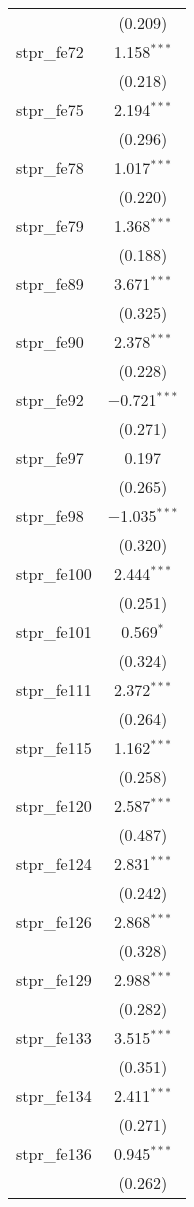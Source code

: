 \begin{table}[!htbp]
\begin{tabular}{@{\extracolsep{5pt}}lc}
  & (0.209) \\ 
  stpr\_fe72 & 1.158$^{***}$ \\ 
  & (0.218) \\ 
  stpr\_fe75 & 2.194$^{***}$ \\ 
  & (0.296) \\ 
  stpr\_fe78 & 1.017$^{***}$ \\ 
  & (0.220) \\ 
  stpr\_fe79 & 1.368$^{***}$ \\ 
  & (0.188) \\ 
  stpr\_fe89 & 3.671$^{***}$ \\ 
  & (0.325) \\ 
  stpr\_fe90 & 2.378$^{***}$ \\ 
  & (0.228) \\ 
  stpr\_fe92 & $-$0.721$^{***}$ \\ 
  & (0.271) \\ 
  stpr\_fe97 & 0.197 \\ 
  & (0.265) \\ 
  stpr\_fe98 & $-$1.035$^{***}$ \\ 
  & (0.320) \\ 
  stpr\_fe100 & 2.444$^{***}$ \\ 
  & (0.251) \\ 
  stpr\_fe101 & 0.569$^{*}$ \\ 
  & (0.324) \\ 
  stpr\_fe111 & 2.372$^{***}$ \\ 
  & (0.264) \\ 
  stpr\_fe115 & 1.162$^{***}$ \\ 
  & (0.258) \\ 
  stpr\_fe120 & 2.587$^{***}$ \\ 
  & (0.487) \\ 
  stpr\_fe124 & 2.831$^{***}$ \\ 
  & (0.242) \\ 
  stpr\_fe126 & 2.868$^{***}$ \\ 
  & (0.328) \\ 
  stpr\_fe129 & 2.988$^{***}$ \\ 
  & (0.282) \\ 
  stpr\_fe133 & 3.515$^{***}$ \\ 
  & (0.351) \\ 
  stpr\_fe134 & 2.411$^{***}$ \\ 
  & (0.271) \\ 
  stpr\_fe136 & 0.945$^{***}$ \\ 
  & (0.262) \\ 

\end{tabular}
\end{table}
